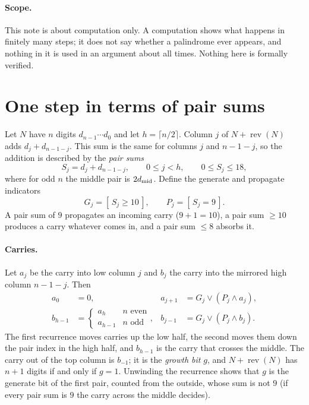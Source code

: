 \documentclass[11pt,a4paper]{article}
\newcommand{\rev}{\operatorname{rev}}
\newcommand{\Iverson}[1]{[\,#1\,]}
\newcommand{\gen}{G}
\newcommand{\prop}{P}
\theoremstyle{remark}
\begin{document}
\paragraph{Scope.}
This note is about computation only. A computation shows what happens in finitely many steps; it does not say whether a palindrome ever appears, and nothing in it is used in an argument about all times. Nothing here is formally verified.

\section{One step in terms of pair sums}\label{sec:pairs}

Let $N$ have $n$ digits $d_{n-1}\cdots d_0$ and let $h=\lceil n/2\rceil$. Column $j$ of $N+\rev(N)$ adds $d_j+d_{n-1-j}$. This sum is the same for columns $j$ and $n-1-j$, so the addition is described by the \emph{pair sums}
\begin{equation}
S_j=d_j+d_{n-1-j},\qquad 0\le j<h,\qquad 0\le S_j\le 18,
\end{equation}
where for odd $n$ the middle pair is $2d_{\rm mid}$. Define the generate and propagate indicators
\begin{equation}
\gen_j=\Iverson{S_j\ge 10},\qquad \prop_j=\Iverson{S_j=9}.
\end{equation}
A pair sum of $9$ propagates an incoming carry ($9+1=10$), a pair sum $\ge10$ produces a carry whatever comes in, and a pair sum $\le 8$ absorbs it.

\paragraph{Carries.}
Let $a_j$ be the carry into low column $j$ and $b_j$ the carry into the mirrored high column $n-1-j$. Then
\begin{align}
a_0&=0, & a_{j+1}&=\gen_j\lor(\prop_j\land a_j),\\
b_{h-1}&=\begin{cases}a_h&n\text{ even}\\ a_{h-1}&n\text{ odd}\end{cases}, & b_{j-1}&=\gen_j\lor(\prop_j\land b_j).
\end{align}
The first recurrence moves carries up the low half, the second moves them down the pair index in the high half, and $b_{h-1}$ is the carry that crosses the middle. The carry out of the top column is $b_{-1}$; it is the \emph{growth bit} $g$, and $N+\rev(N)$ has $n+1$ digits if and only if $g=1$. Unwinding the recurrence shows that $g$ is the generate bit of the first pair, counted from the outside, whose sum is not $9$ (if every pair sum is $9$ the carry across the middle decides).
\end{document}
